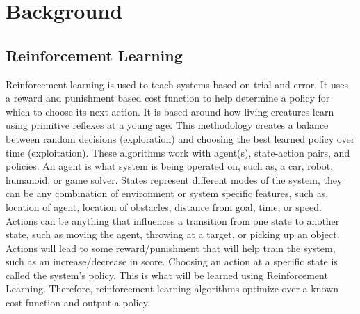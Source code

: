 \documentclass[12pt,american]{report}
\begin{document}
\chapter{Background}
\label{sec:background}

\section{Reinforcement Learning}
Reinforcement learning is used to teach systems based on trial and error.  It uses a reward and punishment based cost function to help determine a policy for which to choose its next action.  It is based around how living creatures learn using primitive reflexes at a young age. This methodology creates a balance between random decisions (exploration) and choosing the best learned policy over time (exploitation). These algorithms work with agent(s), state-action pairs, and policies. An agent is what system is being operated on, such as, a car, robot, humanoid, or game solver. States represent different modes of the system, they can be any combination of environment or system specific features, such as, location of agent, location of obstacles, distance from goal, time, or speed. Actions can be anything that influences a transition from one state to another state, such as moving the agent, throwing at a target, or picking up an object.  Actions will lead to some reward/punishment that will help train the system, such as an increase/decrease in score.  Choosing an action at a specific state is called the system's policy. This is what will be learned using Reinforcement Learning.  Therefore, reinforcement learning algorithms optimize over a known cost function and output a policy.
\end{document}
